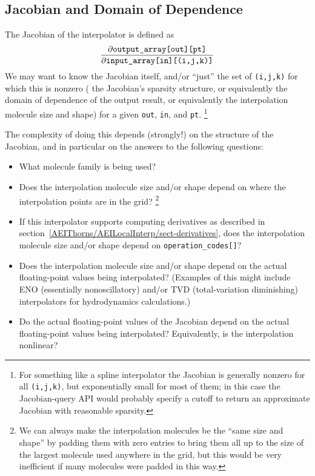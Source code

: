 
\subsection{Jacobian and Domain of Dependence}
\label{AEIThorns/AEILocalInterp/sect-Jacobian}

The Jacobian of the interpolator is defined as
\begin{equation}
\frac{\partial \hbox{\tt output\_array[out][pt]}}
     {\partial \hbox{\tt input\_array[in][(i,j,k)]}}
				\label{AEIThorns/AEILocalInterp/eqn-Jacobian}
\end{equation}
We may want to know the Jacobian itself, and/or ``just'' the set of
\verb|(i,j,k)| for which this is nonzero (\ie{} the Jacobian's sparsity
structure, or equivalently the domain of dependence of the output result,
or equivalently the interpolation molecule size and shape) for a given
\verb|out|, \verb|in|, and \verb|pt|.%
\footnote{%
	 For something like a spline interpolator the Jacobian
	 is generally nonzero for all {\tt (i,j,k)}, but
	 exponentially small for most of them; in this case
	 the Jacobian-query API would probably specify a cutoff
	 to return an approximate Jacobian with reasonable sparsity.
	 }%

The complexity of doing this depends (strongly!) on the structure
of the Jacobian, and in particular on the answers to the following
questions:
\begin{itemize}
\item	What molecule family is being used?
\item	Does the interpolation molecule size and/or shape depend
	on where the interpolation points are in the grid?%
\footnote{%
	 We can always make the interpolation molecules be
	 the ``same size and shape'' by padding them with
	 zero entries to bring them all up to the size of
	 the largest molecule used anywhere in the grid,
	 but this would be very inefficient if many molecules
	 were padded in this way.
	 }%
\item	If this interpolator supports computing derivatives
	as described in section~\ref{AEIThorns/AEILocalInterp/sect-derivatives},
	does the interpolation molecule size and/or shape depend
	on \verb|operation_codes[]|?
\item	Does the interpolation molecule size and/or shape depend
	on the actual floating-point values being interpolated?
	(Examples of this might include ENO (essentially nonoscillatory)
	and/or TVD (total-variation diminishing) interpolators for
	hydrodynamics calculations.)
\item	Do the actual floating-point values of the Jacobian depend
	on the actual floating-point values being interpolated?
	Equivalently, is the interpolation nonlinear?
\end{itemize}

